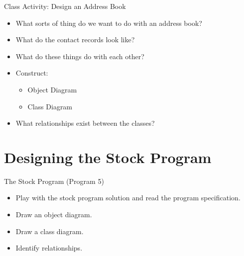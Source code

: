 \documentclass[]{beamer}
\begin{document}
\begin{frame}{Class Activity: Design an Address Book}
    \begin{itemize}
        \item What sorts of thing do we want to do with an address
            book?
        \item What do the contact records look like?
        \item What do these things do with each other?
        \item Construct:
            \begin{itemize}
                \item Object Diagram
                \item Class Diagram
            \end{itemize}
        \item What relationships exist between the classes?
    \end{itemize}
\end{frame}

\section{Designing the Stock Program}

\begin{frame}{The Stock Program (Program 5)}
    \begin{itemize}
        \item Play with the stock program solution and read the
            program specification.
        \item Draw an object diagram.
        \item Draw a class diagram.
        \item Identify relationships.
    \end{itemize}
\end{frame}
\end{document}
